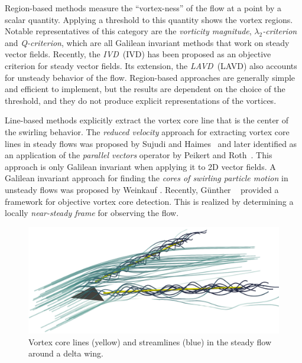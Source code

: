 %
Region-based methods measure the ``vortex-ness'' of the flow at a point by a
scalar quantity.
%
Applying a threshold to this quantity shows the vortex regions.
%
Notable representatives of this category are the \emph{vorticity magnitude},
\emph{$\lambda_2$-criterion} and \emph{Q-criterion}, which are all Galilean
invariant methods that work on steady vector fields.
%
Recently, the \emph{\acl{IVD}}~(\acs{IVD}) has been proposed as an objective
criterion for steady vector fields.
%
Its extension, the \emph{\acl{LAVD}}~(\acs{LAVD}) also accounts for unsteady
behavior of the flow.
%
Region-based approaches are generally simple and efficient to implement, but the
results are dependent on the choice of the threshold, and they do not produce
explicit representations of the vortices.
%

%
Line-based methods explicitly extract the vortex core line that is the center
of the swirling behavior.
%
The \emph{reduced velocity} approach for extracting vortex core lines in steady
flows was proposed by Sujudi and Haimes~\cite{Sujudi1995} and later identified
as an application of the \emph{parallel vectors} operator by Peikert and
Roth~\cite{Peikert1999}.
%
This approach is only Galilean invariant when applying it to \ac{2D} vector
fields.
%
A Galilean invariant approach for finding the \emph{cores of swirling particle
motion} in unsteady flows was proposed by Weinkauf \etal \cite{Weinkauf2007}.
%
Recently, G\"unther \etal~\cite{Guenther2017} provided a framework for
objective vortex core detection.
%
This is realized by determining a locally \emph{near-steady frame} for observing
the flow.
%
\begin{figure}[t]
    \centering
    \includegraphics[width=\linewidth]{figures/DeltaWingStreamlines.png}
    \caption{Vortex core lines (yellow) and streamlines (blue) in the steady
    flow around a delta wing.}
    \label{fig:delta_wing_vortex_cores}
\end{figure}
%

%
